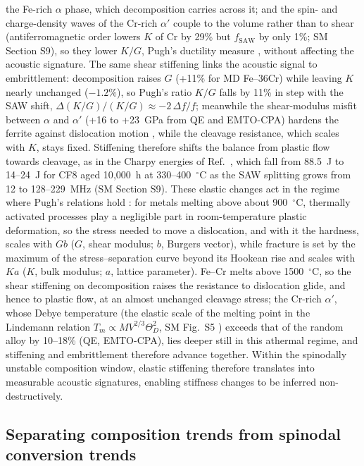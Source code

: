 \documentclass[final,3p,times]{elsarticle}
\begin{document}
the Fe-rich $\alpha$ phase, which decomposition carries across it; and the spin- and charge-density waves of the Cr-rich $\alpha'$ couple to the volume rather than to shear (antiferromagnetic order lowers $K$ of Cr by 29\% but $f_{\mathrm{SAW}}$ by only 1\%; SM Section S9), so they lower $K/G$, Pugh's ductility measure \cite{pugh1954xcii}, without affecting the acoustic signature. The same shear stiffening links the acoustic signal to embrittlement: decomposition raises $G$ (+11\% for MD Fe--36Cr) while leaving $K$ nearly unchanged ($-1.2\%$), so Pugh's ratio $K/G$ falls by 11\% \cite{pugh1954xcii} in step with the SAW shift, $\Delta(K/G)/(K/G)\approx-2\,\Delta f/f$; meanwhile the shear-modulus misfit between $\alpha$ and $\alpha'$ (+16 to +23~GPa from QE and EMTO-CPA) hardens the ferrite against dislocation motion \cite{kato1981hardening}, while the cleavage resistance, which scales with $K$, stays fixed. Stiffening therefore shifts the balance from plastic flow towards cleavage, as in the Charpy energies of Ref.~\cite{al2023detecting}, which fall from 88.5~J to 14--24~J for CF8 aged 10{,}000~h at 330--400~$^\circ$C as the SAW splitting grows from 12 to 128--229~MHz (SM Section S9). These elastic changes act in the regime where Pugh's relations hold \cite{pugh1954xcii}: for metals melting above about 900~$^\circ$C, thermally activated processes play a negligible part in room-temperature plastic deformation, so the stress needed to move a dislocation, and with it the hardness, scales with $Gb$ ($G$, shear modulus; $b$, Burgers vector), while fracture is set by the maximum of the stress--separation curve beyond its Hookean rise and scales with $Ka$ ($K$, bulk modulus; $a$, lattice parameter). Fe--Cr melts above 1500~$^\circ$C, so the shear stiffening on decomposition raises the resistance to dislocation glide, and hence to plastic flow, at an almost unchanged cleavage stress; the Cr-rich $\alpha'$, whose Debye temperature (the elastic scale of the melting point in the Lindemann relation $T_m\propto MV^{2/3}\Theta_D^2$, SM Fig.~S5 \cite{fine1984elastic}) exceeds that of the random alloy by 10--18\% (QE, EMTO-CPA), lies deeper still in this athermal regime, and stiffening and embrittlement therefore advance together. Within the spinodally unstable composition window, elastic stiffening therefore translates into measurable acoustic signatures, enabling stiffness changes to be inferred non-destructively.

\subsection{Separating composition trends from spinodal conversion trends}
\end{document}
